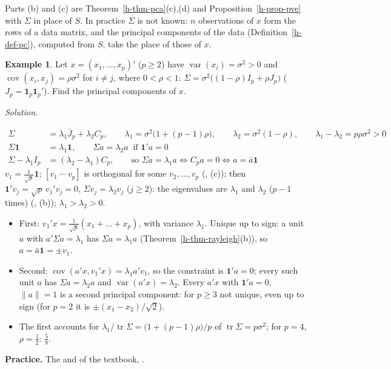 \documentclass[12pt]{article}
\newcommand{\R}{\mathbb R}
\newcommand{\one}{\mathbf 1}
\DeclareMathOperator{\tr}{tr}
\DeclareMathOperator\var{var}
\DeclareMathOperator\cov{cov}
\theoremstyle{definition}
\newtheorem{example}[theorem]{Example}
\newcommand{\boardtop}{\vspace*{-\abovedisplayskip}}
\begin{document}
Parts (b) and (c) are Theorem~\ref{h-thm-pca}(c),(d) and Proposition~\ref{h-prop-pve} with \(\Sigma\) in place of \(S\).
In practice \(\Sigma\) is not known: \(n\) observations of \(x\) form the rows of a data matrix, and the principal
components of the data (Definition~\ref{h-def-pc}), computed from \(S\), take the place of those of \(x\).

\begin{example}\label{h-exm-equicorrelation}
Let \(x=(x_1,\dots,x_p)'\) (\(p\geqslant2\)) have \(\var(x_i)=\sigma^2>0\) and
\(\cov(x_i,x_j)=\rho\sigma^2\) for \(i\ne j\), where \(0<\rho<1\):
\(\Sigma=\sigma^2\bigl((1-\rho)I_p+\rho J_p\bigr)\) (\(J_p=\one_p\one_p'\)). Find the principal components of \(x\).
\end{example}
\textit{Solution.}
\begin{board}[\(I_p=\bar J_p+C_p\), \(J_p=p\bar J_p\); for \(a\in\R^p\), \(\bar J_pa=\bar a\one\), \(C_pa=a-\bar a\one\)
(\lec{1}, \lit{Definition~14}, \lit{Example~16}):]
\boardtop
\begin{align*}
\Sigma&=\lambda_1\bar J_p+\lambda_2C_p,\qquad\lambda_1=\sigma^2\bigl(1+(p-1)\rho\bigr),\qquad\lambda_2=\sigma^2(1-\rho),\qquad\lambda_1-\lambda_2=p\rho\sigma^2>0\\
\Sigma\one&=\lambda_1\one,\qquad\Sigma a=\lambda_2a\ \text{ if }\one'a=0\\
\Sigma-\lambda_1I_p&=(\lambda_2-\lambda_1)C_p,\qquad\text{so }\Sigma a=\lambda_1a\iff C_pa=0\iff a=\bar a\one
\end{align*}
\(v_1=\frac1{\sqrt p}\one\); \([v_1\ \cdots\ v_p]\) is orthogonal for some \(v_2,\dots,v_p\) (,
(c)); then \(\one'v_j=\sqrt p\,v_1'v_j=0\), \(\Sigma v_j=\lambda_2v_j\) (\(j\geqslant2\)): the eigenvalues
are \(\lambda_1\) and \(\lambda_2\) (\(p-1\) times) (, (b)); \(\lambda_1>\lambda_2>0\).
\end{board}
\begin{board}
\begin{itemize}
\item First: \(v_1'x=\frac1{\sqrt p}(x_1+\dots+x_p)\), with variance \(\lambda_1\). Unique up to sign: a unit \(a\) with
\(a'\Sigma a=\lambda_1\) has \(\Sigma a=\lambda_1a\) (Theorem~\ref{h-thm-rayleigh}(b)), so \(a=\bar a\one=\pm v_1\).
\item Second: \(\cov(a'x,v_1'x)=\lambda_1a'v_1\), so the constraint is \(\one'a=0\); every such unit \(a\)
has \(\Sigma a=\lambda_2a\) and \(\var(a'x)=\lambda_2\). Every \(a'x\) with \(\one'a=0\), \(\lVert a\rVert=1\)
is a second principal component: for \(p\geqslant3\) not unique, even up to sign (for \(p=2\) it is
\(\pm(x_1-x_2)/\sqrt2\)).
\item The first accounts for \(\lambda_1/\tr\Sigma=\bigl(1+(p-1)\rho\bigr)/p\) of \(\tr\Sigma=p\sigma^2\); for
\(p=4\), \(\rho=\frac12\): \(\frac58\).
\end{itemize}
\end{board}

\bigskip
\textbf{Practice.} The  and  of the textbook, .
\end{document}
